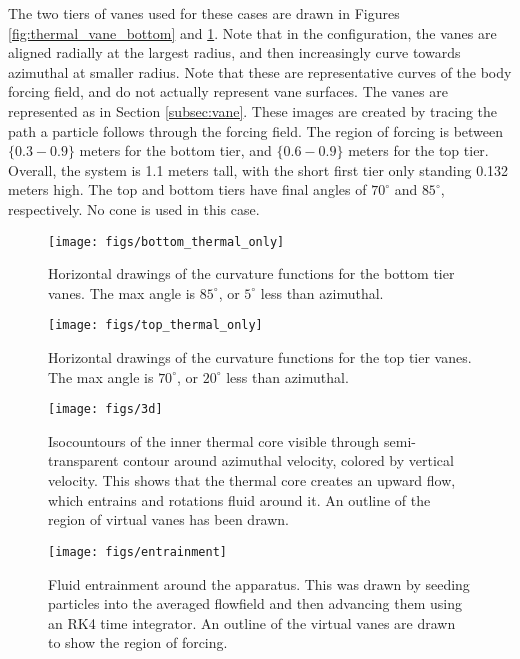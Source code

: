 The two tiers of vanes used for these cases are drawn in Figures
\ref{fig:thermal_vane_bottom} and \ref{fig:thermal_vane_top}. Note that in the
configuration, the vanes are 
aligned radially at the largest radius, and then increasingly curve
towards azimuthal at smaller radius. Note that these are representative
curves of the body forcing field, and do not actually represent vane
surfaces. The vanes are represented as in Section \ref{subsec:vane}. 
These images are created by tracing the path a particle follows through
the forcing field. The region of forcing is between $\{0.3-0.9\}$ meters
for the bottom tier, and $\{0.6-0.9\}$ meters for the top tier. Overall,
the system is 1.1 meters tall, with the short first tier only standing
0.132 meters high. The top and bottom tiers have final angles of
$70^{\circ}$ and $85^{\circ}$, respectively. No cone is used in this
case. 

\begin{figure}[htb]
\centering
\begin{minipage}{0.45\textwidth}
\centering
 \texttt{[image: figs/bottom\_thermal\_only]}
 \caption{Horizontal drawings of the curvature functions for the bottom tier
 vanes. The max angle is $85^{\circ}$, or $5^{\circ}$ less than azimuthal.}
 \label{fig:thermal_vane_bottom}  
\end{minipage}\hfill
\begin{minipage}{0.45\textwidth}
\centering
\texttt{[image: figs/top\_thermal\_only]}
\caption{Horizontal drawings of the curvature functions for the top tier
 vanes. The max angle is $70^{\circ}$, or $20^{\circ}$ less than
 azimuthal.} 
 \label{fig:thermal_vane_top}  
\end{minipage}
\end{figure}

\begin{figure}[htb]
\centering
\begin{minipage}{0.45\textwidth}
\centering
 \texttt{[image: figs/3d]}
 \caption{Isocountours of the inner thermal core
  visible through semi-transparent contour around azimuthal velocity,
  colored by vertical velocity. This shows that the thermal core creates
 an upward flow, which entrains and rotations fluid around it. An
 outline of the region of virtual vanes has been drawn.}
 \label{fig:thermal}  
\end{minipage}\hfill
\begin{minipage}{0.45\textwidth}
\centering
\texttt{[image: figs/entrainment]}
\caption{Fluid entrainment around the apparatus. This was drawn by
 seeding particles into the averaged flowfield and then advancing them
 using an RK4 time integrator. An outline of the
  virtual vanes are drawn to show the region of forcing.}
 \label{fig:entrain}  
\end{minipage}
\end{figure}


